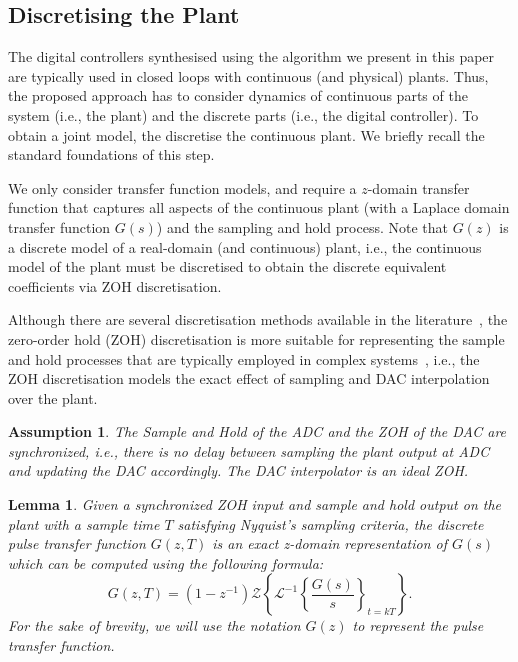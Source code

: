 \documentclass{sig-alternate-05-2015}
\newcommand{\red}[1]{{\color{red}#1}}
\newtheorem{myassumption}{Assumption}
\newtheorem{mylemma}{Lemma}
\begin{document}
\subsection{Discretising the Plant}
\label{ssec:SandH}

The digital controllers synthesised using the algorithm we present in this
paper are typically used in closed loops with continuous (and physical)
plants.  Thus, the proposed approach has to consider dynamics of continuous
parts of the system (i.e., the plant) and the discrete parts (i.e., the
digital controller).  To obtain a joint model, the discretise the continuous
plant. We briefly recall the standard foundations of this step.

We only consider transfer function models, and require a $z$-domain
transfer function that captures all aspects of the continuous plant (with a
Laplace domain transfer function $G(s)$) and the sampling and hold process.
Note that $G(z)$ is a discrete model of a real-domain (and continuous)
plant, i.e., the continuous model of the plant must be discretised to obtain
the discrete equivalent coefficients via ZOH discretisation.


Although there are several discretisation methods available in the
literature~\cite{Franklin15}, the zero-order hold (ZOH) discretisation is
more suitable for representing the sample and hold processes that are
typically employed in complex systems~\cite{istepanian2012digital}, i.e.,
the ZOH discretisation models the exact effect of sampling and DAC
interpolation over the plant.

\begin{myassumption}
%
The Sample and Hold of the ADC and the ZOH of the DAC are synchronized,
i.e., there is no delay between sampling the plant output at ADC and
updating the DAC accordingly.  The DAC interpolator is an ideal ZOH.
%
\end{myassumption}

\begin{mylemma}\cite{astrom1997computer}
%
Given a synchronized ZOH input and sample and hold output on the plant with
a sample time $T$ satisfying Nyquist's sampling criteria, the discrete pulse
transfer function $G(z,T)$ is an exact z-domain representation of $G(s)$
which can be computed using the following formula:
%
\begin{equation}
\label{eq:pulsetf}
G(z,T) = %
(1-z^{-1})\mathcal{Z}\left\lbrace{\mathcal{L}^{-1}\left\lbrace{\frac{G(s)}{s}}\right\rbrace_{t=kT}}\right\rbrace.
\end{equation}
%
For the sake of brevity, we will use the notation $G(z)$ to represent the
pulse transfer function.
%
\end{mylemma}
\end{document}
